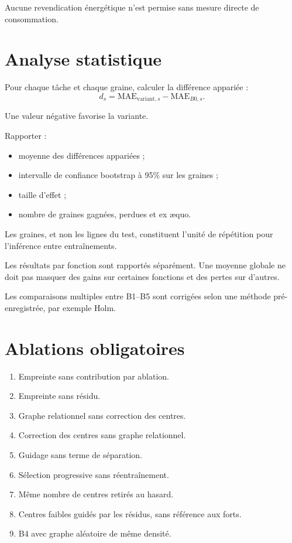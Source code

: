 \documentclass[11pt,a4paper]{article}
\begin{document}
Aucune revendication énergétique n'est permise sans mesure directe
de consommation.

\section{Analyse statistique}

Pour chaque tâche et chaque graine, calculer la différence appariée :
\[
d_s=\mathrm{MAE}_{\mathrm{variant},s}
-\mathrm{MAE}_{B0,s}.
\]

Une valeur négative favorise la variante.

Rapporter :
\begin{itemize}
  \item moyenne des différences appariées ;
  \item intervalle de confiance bootstrap à 95\% sur les graines ;
  \item taille d'effet ;
  \item nombre de graines gagnées, perdues et ex æquo.
\end{itemize}

Les graines, et non les lignes du test, constituent l'unité de répétition
pour l'inférence entre entraînements.

Les résultats par fonction sont rapportés séparément. Une moyenne globale
ne doit pas masquer des gains sur certaines fonctions et des pertes
sur d'autres.

Les comparaisons multiples entre B1--B5 sont corrigées selon une méthode
pré-enregistrée, par exemple Holm.

\section{Ablations obligatoires}

\begin{enumerate}
  \item Empreinte sans contribution par ablation.
  \item Empreinte sans résidu.
  \item Graphe relationnel sans correction des centres.
  \item Correction des centres sans graphe relationnel.
  \item Guidage sans terme de séparation.
  \item Sélection progressive sans réentraînement.
  \item Même nombre de centres retirés au hasard.
  \item Centres faibles guidés par les résidus, sans référence aux forts.
  \item B4 avec graphe aléatoire de même densité.
\end{enumerate}
\end{document}
